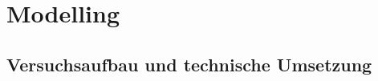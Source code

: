 \documentclass[12pt,a4paper]{article}
\begin{document}
%

\section{Modelling}
\subsection{Versuchsaufbau und technische Umsetzung}
\end{document}
